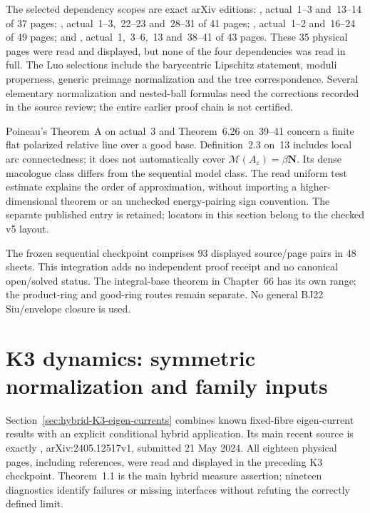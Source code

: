 The selected dependency scopes are exact arXiv editions:
\cite{Rumely13ResultantV2}, actual~1--3 and~13--14 of 37 pages;
\cite{Luo21LimitsV4}, actual~1--3,~22--23 and~28--31 of 41 pages;
\cite{Luo21TreesV2}, actual~1--2 and~16--24 of 49 pages; and
\cite{Poi25DynamicsZV5}, actual~1,~3--6,~13 and~38--41 of 43 pages.
These 35 physical pages were read and displayed, but none of the
four dependencies was read in full. The Luo selections include the
barycentric Lipschitz statement, moduli properness, generic preimage
normalization and the tree correspondence. Several elementary
normalization and nested-ball formulas need the corrections recorded
in the source review; the entire earlier proof chain is not certified.

Poineau's Theorem~A on actual~3 and Theorem~6.26 on~39--41 concern
a finite flat polarized relative line over a good base.
Definition~2.3 on~13 includes local arc connectedness; it does not
automatically cover $\mathcal M(A_\varepsilon)=\beta\mathbf N$.
Its dense macologue class differs from the sequential model class.
The read uniform test estimate explains the order of approximation,
without importing a higher-dimensional theorem or an unchecked
energy-pairing sign convention. The separate published entry
\cite{Poi26DynamicsZ} is retained; locators in this section belong
to the checked v5 layout.

The frozen sequential checkpoint comprises 93 displayed source/page
pairs in 48 sheets. This integration adds no independent proof
receipt and no canonical open/solved status. The integral-base
theorem in Chapter~66 has its own range; the product-ring and good-ring
routes remain separate. No general BJ22 Siu/envelope closure is used.

\section{K3 dynamics: symmetric normalization and family inputs}
\label{sec:provenance-hybrid-K3}

Section~\ref{sec:hybrid-K3-eigen-currents} combines known fixed-fibre
eigen-current results with an explicit conditional hybrid application.
Its main recent source is exactly \cite{Irokawa24K3V1},
arXiv:\allowbreak 2405.12517v1, submitted 21 May 2024.
All eighteen physical pages, including references, were read and
displayed in the preceding K3 checkpoint. Theorem~1.1 is the main
hybrid measure assertion; nineteen diagnostics identify failures
or missing interfaces without refuting the correctly defined limit.

